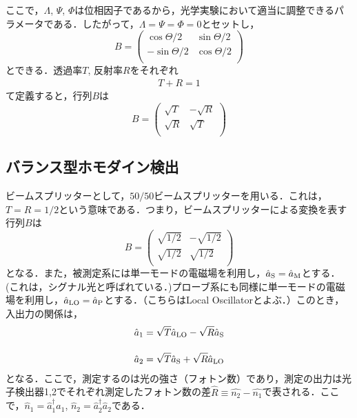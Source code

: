 ここで，$\Lambda$, $\Psi$, $\Phi$は位相因子であるから，光学実験において適当に調整できるパラメータである．したがって，$\Lambda=\Psi=\Phi=0$とセットし，
\begin{equation}
    B=
        \left(
        \begin{array}{cc}
       \cos{\Theta/2}&\sin{\Theta/2}\\[10pt]
        -\sin{\Theta/2}&\cos{\Theta/2} \\
        \end{array}
        \right)
\end{equation}
とできる．透過率$T$, 反射率$R$をそれぞれ
\begin{align}
    T + R =1
\end{align}
て定義すると，行列$B$は
\begin{equation}
    B=
        \left(
        \begin{array}{cc}
       \sqrt{T}&-\sqrt{R}\\[10pt]
        \sqrt{R}&\sqrt{T}\\
        \end{array}
        \right)
\end{equation}

\subsection{バランス型ホモダイン検出}
ビームスプリッターとして，$50/50$ビームスプリッターを用いる．これは，$T=R=1/2$という意味である．つまり，ビームスプリッターによる変換を表す行列$B$は
\begin{equation}
    B=
        \left(
        \begin{array}{cc}
       \sqrt{1/2}&-\sqrt{1/2}\\[10pt]
        \sqrt{1/2}&\sqrt{1/2}\\
        \end{array}
        \right)
\end{equation}
となる．また，被測定系には単一モードの電磁場を利用し，$\hat{a}_{\rm{S}} = \hat{a}_{\rm{M}}$とする．(これは，シグナル光と呼ばれている．)プローブ系にも同様に単一モードの電磁場を利用し，$\hat{a}_{\rm{LO}} = \hat{a}_{\rm{P}}$とする．（こちらはLocal Oscillatorとよぶ．）このとき，入出力の関係は，
\begin{align}
    \hat{a}_1 &= \sqrt{T}\hat{a}_{\rm{LO}} - \sqrt{R}\hat{a}_{\rm{S}}\\[10pt]
    \hat{a}_2 &= \sqrt{T}\hat{a}_{\rm{S}} + \sqrt{R}\hat{a}_{\rm{LO}}
\end{align}
となる．ここで，測定するのは光の強さ（フォトン数）であり，測定の出力は光子検出器1,2でそれぞれ測定したフォトン数の差$\hat{R}\equiv\hat{n_2}-\hat{n_1}$で表される．ここで，$\hat{n}_1=\hat{a}^{\dag}_1\hat{a}_1$, $\hat{n}_2=\hat{a}^{\dag}_2\hat{a}_2$である．

